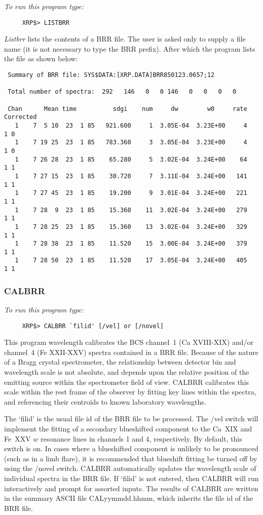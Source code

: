 {\em To run this program type:}
\begin{verbatim}
     XRP$> LISTBRR
\end{verbatim}
  {\em Listbrr} lists the contents of a BRR file. The user is asked
   only to supply a file name (it is not necessary to type the BRR prefix).
   After which the program lists the file as shown below:
\begin{verbatim}
 Summary of BRR file: SYS$DATA:[XRP.DATA]BRR850123.0657;12

 Total number of spectra:  292   146   0   0 146   0   0   0   0

 Chan      Mean time          sdgi    num     dw        w0     rate Corrected
   1    7  5 10  23  1 85   921.600     1  3.05E-04  3.23E+00     4    1 0
   1    7 19 25  23  1 85   783.360     3  3.05E-04  3.23E+00     4    1 0
   1    7 26 28  23  1 85    65.280     5  3.02E-04  3.24E+00    64    1 1
   1    7 27 15  23  1 85    30.720     7  3.11E-04  3.24E+00   141    1 1
   1    7 27 45  23  1 85    19.200     9  3.01E-04  3.24E+00   221    1 1
   1    7 28  9  23  1 85    15.360    11  3.02E-04  3.24E+00   279    1 1
   1    7 28 25  23  1 85    15.360    13  3.02E-04  3.24E+00   329    1 1
   1    7 28 38  23  1 85    11.520    15  3.00E-04  3.24E+00   379    1 1
   1    7 28 50  23  1 85    11.520    17  3.05E-04  3.24E+00   405    1 1
\end{verbatim}

\subsubsection{CALBRR}

{\em To run this program type:}
\begin{verbatim}
     XRP$> CALBRR `filid' [/vel] or [/novel]
\end{verbatim}
This program wavelength calibrates the BCS channel~1 (Ca XVIII-XIX) and/or
channel~4 (Fe XXII-XXV) spectra contained in a BRR file. Because of the nature
of a Bragg crystal spectrometer, the relationship between detector bin and
wavelength scale is not absolute, and depends upon the relative  position of
the  emitting source within the spectrometer field of view.  CALBRR calibrates
this scale within the rest frame of the observer by fitting key lines within
the spectra, and referencing their centroids to known laboratory wavelengths.

The `filid' is the usual file id of the BRR file to be processed.
The /vel switch will implement the fitting of a secondary blueshifted
component to the Ca~XIX and Fe~XXV $w$ resonance lines in channels 1 and 4,
respectively. By default, this switch is on. In cases where a blueshifted
component is unlikely to be pronounced (such as in a limb flare), it is
recommended that blueshift fitting be turned off by using the /novel switch.
CALBRR automatically updates the wavelength scale  of individual spectra in the
BRR file. If `filid' is not entered, then CALBRR will run interactively and
prompt for assorted inputs. The results of CALBRR are written in the summary
ASCII file  CALyymmdd.hhmm, which inherits the file id of the BRR file.

